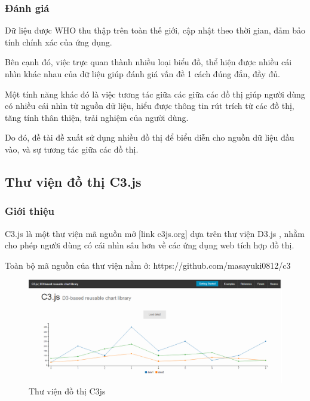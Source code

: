 \documentclass[12pt,a4paper,oneside]{article}
\begin{document}
\subsubsection{Đánh giá}
Dữ liệu được WHO thu thập trên toàn thế giới, cập nhật theo thời gian, đảm bảo tính chính xác của ứng dụng.

Bên cạnh đó, việc trực quan thành nhiều loại biểu đồ, thể hiện được nhiều cái nhìn khác nhau của dữ liệu giúp đánh giá vấn đề 1 cách đúng đắn, đầy đủ.

Một tính năng khác đó là việc tương tác giữa các giữa các đồ thị giúp người dùng có nhiều cái nhìn từ nguồn dữ liệu, hiểu được thông tin rút trích từ các đồ thị, tăng tính thân thiện, trải nghiệm của người dùng.

Do đó, đề tài đề xuất sử dụng nhiều đồ thị để biểu diễn cho nguồn dữ liệu đầu vào, và sự tương tác giữa các đồ thị.

\subsection{Thư viện đồ thị C3.js}
\subsubsection{Giới thiệu}
C3.js là một thư viện mã nguồn mở [link c3js.org] dựa trên thư viện D3.js , nhằm cho phép người dùng có cái nhìn sâu hơn về các ứng dụng web tích hợp đồ thị.

Toàn bộ mã nguồn của thư viện nằm ở: https://github.com/masayuki0812/c3
\begin{figure}[htp]
    \includegraphics[scale=.4]{image/c3js}
    \caption{Thư viện đồ thị C3js}
    \label{refhinh5}
\end{figure}
\end{document}
